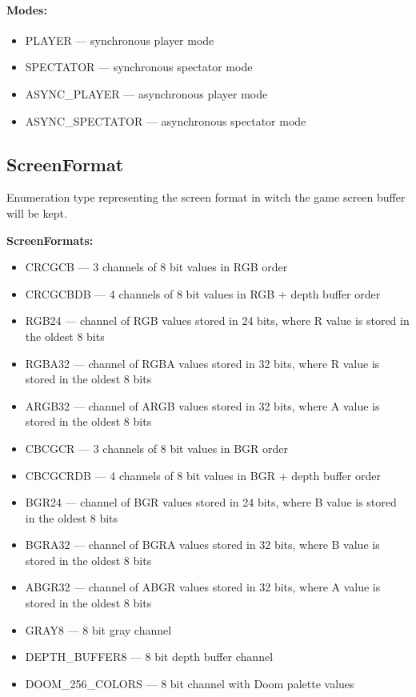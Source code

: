 \paragraph{Modes:}

\begin{itemize}
	\item PLAYER --- synchronous player mode
	\item SPECTATOR --- synchronous spectator mode
	\item ASYNC\_PLAYER --- asynchronous player mode
	\item ASYNC\_SPECTATOR --- asynchronous spectator mode 
\end{itemize}

\subsection{ScreenFormat}\label{subsec:screenformat}
	Enumeration type representing the screen format in witch the game screen buffer will be kept. 


\vspace{20pt}
\textbf{ScreenFormats:}
\begin{itemize}
 \item CRCGCB --- 3 channels of 8 bit values in RGB order
 \item CRCGCBDB --- 4 channels of 8 bit values in RGB + depth buffer order
 \item RGB24 --- channel of RGB values stored in 24 bits, where R value is stored in the oldest 8 bits
 \item RGBA32 --- channel of RGBA values stored in 32 bits, where R value is stored in the oldest 8 bits
 \item ARGB32 --- channel of ARGB values stored in 32 bits, where A value is stored in the oldest 8 bits
 \item CBCGCR --- 3 channels of 8 bit values in BGR order
 \item CBCGCRDB --- 4 channels of 8 bit values in BGR + depth buffer order
 \item BGR24 --- channel of BGR values stored in 24 bits, where B value is stored in the oldest 8 bits
 \item BGRA32 --- channel of BGRA values stored in 32 bits, where B value is stored in the oldest 8 bits 
 \item ABGR32 --- channel of ABGR values stored in 32 bits, where A value is stored in the oldest 8 bits
 \item GRAY8 --- 8 bit gray channel
 \item DEPTH\_BUFFER8 --- 8 bit depth buffer channel
 \item DOOM\_256\_COLORS --- 8 bit channel with Doom palette values
\end{itemize}
